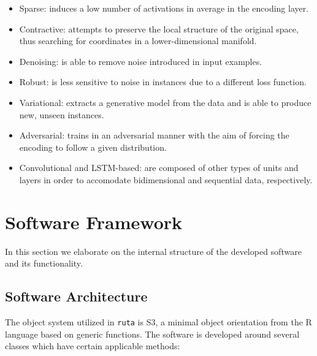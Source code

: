 \documentclass[
	fontsize=11pt, %
	twoside=false, %
	open=any, %
	secnumdepth=1, %
]{kaobook}
\begin{document}
\begin{itemize}
\item Sparse: induces a low number of activations in average in the encoding layer.
\item Contractive: attempts to preserve the local structure of the original space, thus searching for coordinates in a lower-dimensional manifold.
\item Denoising: is able to remove noise introduced in input examples.
\item Robust: is less sensitive to noise in instances due to a different loss function.
\item Variational: extracts a generative model from the data and is able to produce new, unseen instances.
\item Adversarial: trains in an adversarial manner with the aim of forcing the encoding to follow a given distribution.
\item Convolutional and LSTM-based: are composed of other types of units and layers in order to accomodate bidimensional and sequential data, respectively.
\end{itemize}



\section{Software Framework }
\label{sec.framework}

In this section we elaborate on the internal structure of the developed software and its functionality.

\subsection{Software Architecture}
\label{sec.architecture}


The object system utilized in \texttt{ruta} is S3, a minimal object orientation from the R language based on generic functions. The software is developed around several classes which have certain applicable methods:
\end{document}
